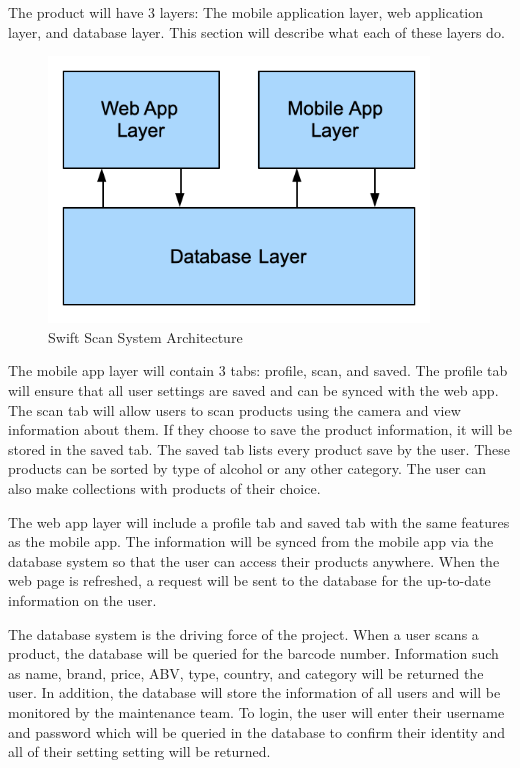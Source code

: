 The product will have 3 layers: The mobile application layer, web application layer, and database layer. This section will describe what each of these layers do.

\begin{figure}[h!]
	\centering
 	\includegraphics[width=0.90\textwidth]{images/architectural_layer_diagram.png}
 \caption{Swift Scan System Architecture}
\end{figure}

The mobile app layer will contain 3 tabs: profile, scan, and saved. The profile tab will ensure that all user settings are saved and can be synced with the web app. The scan tab will allow users to scan products using the camera and view information about them. If they choose to save the product information, it will be stored in the saved tab. The saved tab lists every product save by the user. These products can be sorted by type of alcohol or any other category. The user can also make collections with products of their choice.

The web app layer will include a profile tab and saved tab with the same features as the mobile app. The information will be synced from the mobile app via the database system so that the user can access their products anywhere. When the web page is refreshed, a request will be sent to the database for the up-to-date information on the user.

The database system is the driving force of the project. When a user scans a product, the database will be queried for the barcode number. Information such as name, brand, price, ABV, type, country, and category will be returned the user. In addition, the database will store the information of all users and will be monitored by the maintenance team. To login, the user will enter their username and password which will be queried in the database to confirm their identity and all of their setting setting will be returned.

